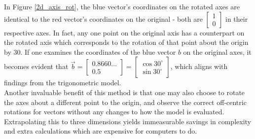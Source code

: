 \documentclass[12pt, a4paper]{article}
\begin{document}
In Figure \ref{2d_axis_rot}, the blue vector's coordinates on the rotated axes
are identical to the red vector's coordinates on the original - both are
$\begin{bmatrix}1 \\ 0\end{bmatrix}$ in their respective axes. In fact, any one
point on the original axis has a counterpart on the rotated axis which
corresponds to the rotation of that point about the origin by $30$\textdegree.
If one examines the coordinates of the blue vector $b$ on the original axes, it
becomes evident that
$
    \vec{b}
    =
    \begin{bmatrix}
        0.8660 \hdots \\ 0.5
    \end{bmatrix}
    =
    \begin{bmatrix}
        \cos 30^\circ \\
        \sin 30^\circ
    \end{bmatrix}
$, which aligns with findings from the trigonometric model. \\

Another invaluable benefit of this method is that one may also choose to rotate
the axes about a different point to the origin, and observe the correct
off-centric rotations for vectors without any changes to how the model is
evaluated. Extrapolating this to three dimensions yields immeasurable savings in
complexity and extra calculations which are expensive for computers to do. \\
\end{document}
